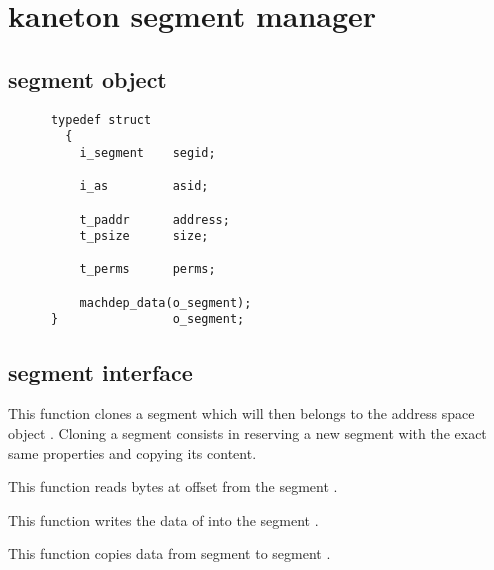 \section{kaneton segment manager}

\subsection*{segment object}

\begin{verbatim}
      typedef struct
        {
          i_segment    segid;

          i_as         asid;

          t_paddr      address;
          t_psize      size;

          t_perms      perms;

          machdep_data(o_segment);
      }                o_segment;
\end{verbatim}

\subsection*{segment interface}

	 {
	   This function clones a segment which will then belongs to
	   the address space object . Cloning a segment
	   consists in reserving a new segment with the
	   exact same properties and copying its content.
	 }

	 {
	   This function reads  bytes at offset
	    from the segment .
	 }

	 {
	   This function writes the data of  into the
	   segment .
	 }

	 {
	   This function copies data from segment  to
	   segment .
	 }

